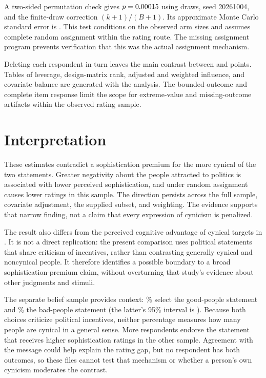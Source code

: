 \documentclass[11pt]{article}
\begin{document}
A two-sided permutation check gives $p=0.00015{}$ using
\PermutationDraws{} draws, seed 20261004, and the finite-draw correction
$(k+1)/(B+1)$. Its approximate Monte Carlo standard error is
\PermutationMCSE{}. This test conditions on the observed arm sizes and assumes
complete random assignment within the rating route. The missing assignment
program prevents verification that this was the actual assignment mechanism.

Deleting each respondent in turn leaves the main contrast between
\LeaveMin{} and \LeaveMax{} points. Tables of leverage, design-matrix rank,
adjusted and weighted influence, and covariate balance are generated with the
analysis. The bounded outcome and complete item response limit the scope for
extreme-value and missing-outcome artifacts within the observed rating sample.

\section{Interpretation}

These estimates contradict a sophistication premium for the more cynical of
the two statements. Greater negativity about the people attracted to politics
is associated with lower perceived sophistication, and under random assignment
causes lower ratings in this sample. The direction persists across the full
sample, covariate adjustment, the supplied subset, and weighting. The evidence
supports that narrow finding, not a claim that every expression of cynicism
is penalized.

The result also differs from the perceived cognitive advantage of cynical
targets in \citet{stavrova2019}. It is not a direct replication: the present
comparison uses political statements that share criticism of incentives,
rather than contrasting generally cynical and noncynical people. It therefore
identifies a possible boundary to a broad sophistication-premium claim, without
overturning that study's evidence about other judgments and stimuli.

The separate belief sample provides context: \GoodBeliefPct{}\% select the
good-people statement and \BadBeliefPct{}\% the bad-people statement (the latter's
95\% interval is \BadBeliefCI{}). Because both choices criticize political
incentives, neither percentage measures how many people are cynical in a
general sense. More respondents endorse the statement that receives higher
sophistication ratings in the other sample. Agreement with the message could
help explain the rating gap, but no respondent has both outcomes, so these
files cannot test that mechanism or whether a person's own cynicism moderates
the contrast.
\end{document}
